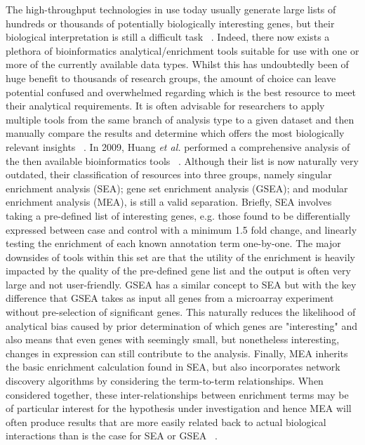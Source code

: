The high-throughput technologies in use today usually generate large lists of hundreds or thousands of potentially biologically interesting genes, but their biological interpretation is still a difficult task ~\autocite{Hua2009}. Indeed, there now exists a plethora of bioinformatics analytical/enrichment tools suitable for use with one or more of the currently available data types. Whilst this has undoubtedly been of huge benefit to thousands of research groups, the amount of choice can leave potential confused and overwhelmed regarding which is the best resource to meet their analytical requirements. It is often advisable for researchers to apply multiple tools from the same branch of analysis type to a given dataset and then manually compare the results and determine which offers the most biologically relevant insights ~\autocite{Hua2009}. In 2009, Huang \textit{et al.} performed a comprehensive analysis of the then available bioinformatics tools ~\autocite{Hua2009}. Although their list is now naturally very outdated, their classification of resources into three groups, namely singular enrichment analysis (SEA); gene set enrichment analysis (GSEA); and modular enrichment analysis (MEA), is still a valid separation. Briefly, SEA involves taking a pre-defined list of interesting genes, e.g. those found to be differentially expressed between case and control with a minimum 1.5 fold change, and linearly testing the enrichment of each known annotation term one-by-one. The major downsides of tools within this set are that the utility of the enrichment is heavily impacted by the quality of the pre-defined gene list and the output is often very large and not user-friendly. GSEA has a similar concept to SEA but with the key difference that GSEA takes as input all genes from a microarray experiment without pre-selection of significant genes. This naturally reduces the likelihood of analytical bias caused by prior determination of which genes are "interesting" and also means that even genes with seemingly small, but nonetheless interesting, changes in expression can still contribute to the analysis. Finally, MEA inherits the basic enrichment calculation found in SEA, but also incorporates network discovery algorithms by considering the term-to-term relationships. When considered together, these inter-relationships between enrichment terms may be of particular interest for the hypothesis under investigation and hence MEA will often produce results that are more easily related back to actual biological interactions than is the case for SEA or GSEA ~\autocite{Hua2009}.

